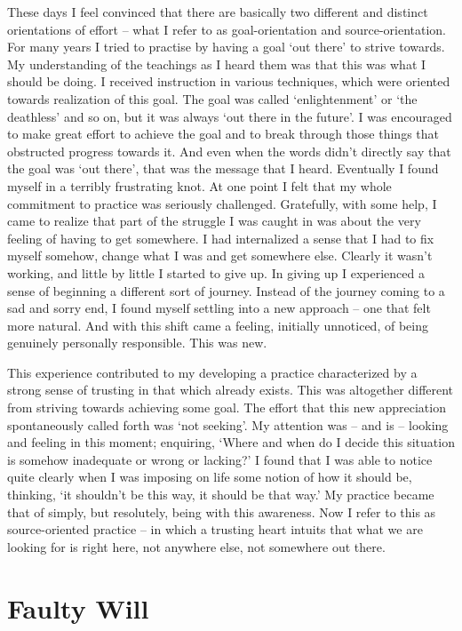 These days I feel convinced that there are basically two different and
distinct orientations of effort -- what I refer to as goal-orientation and
source-orientation. For many years I tried to practise by having a goal
`out there' to strive towards. My understanding of the teachings as I
heard them was that this was what I should be doing. I received
instruction in various techniques, which were oriented towards
realization of this goal. The goal was called `enlightenment' or `the
deathless' and so on, but it was always `out there in the future'. I was
encouraged to make great effort to achieve the goal and to break through
those things that obstructed progress towards it. And even when the
words didn't directly say that the goal was `out there', that was the
message that I heard. Eventually I found myself in a terribly
frustrating knot. At one point I felt that my whole commitment to
practice was seriously challenged. Gratefully, with some help, I came to
realize that part of the struggle I was caught in was about the very feeling of
having to get somewhere. I had internalized a sense that I had to fix
myself somehow, change what I was and get somewhere else. Clearly it
wasn't working, and little by little I started to give up. In giving up I experienced a sense of beginning a different sort of journey. Instead of the journey coming to a sad and sorry end, I found myself settling into a new approach -- one that felt more natural. And with this shift came a feeling, initially unnoticed, of being genuinely personally responsible. This was new.

This experience contributed to my developing a practice characterized by a strong sense of trusting in that which already exists. This was altogether different from striving towards achieving some goal. The effort that this new appreciation spontaneously called forth was `not seeking'. My attention was -- and is -- looking and feeling in this moment; enquiring, `Where and when do I decide this situation is somehow inadequate or wrong or lacking?' I found that I was able to notice quite clearly when I was imposing on life some notion of how it should be, thinking, `it shouldn't be this way, it should be that way.' My practice became that of simply, but resolutely, being with this awareness. Now I refer to this as source-oriented practice -- in which a trusting heart intuits that what we are looking for is right here, not anywhere else, not somewhere out there.

\section{Faulty Will}

